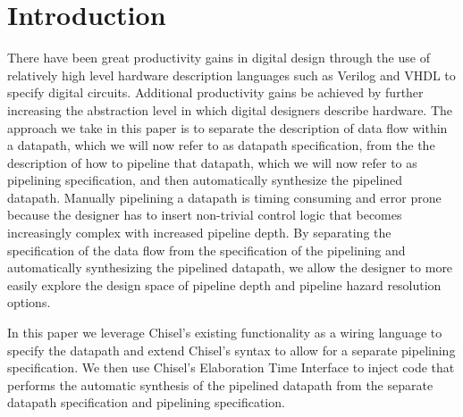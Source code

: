 \section{Introduction}
There have been great productivity gains in digital design through the use of relatively high level hardware description languages such as Verilog and VHDL to specify digital circuits. Additional productivity gains be achieved by further increasing the abstraction level in which digital designers describe hardware. The approach we take in this paper is to separate the description of data flow within a datapath, which we will now refer to as datapath specification, from the the description of how to pipeline that datapath, which we will now refer to as pipelining specification, and then automatically synthesize the pipelined datapath. Manually pipelining a datapath is timing consuming and error prone because the designer has to insert non-trivial control logic that becomes increasingly complex with increased pipeline depth. By separating the specification of the data flow from the specification of the pipelining and automatically synthesizing the pipelined datapath, we allow the designer to more easily explore the design space of pipeline depth and pipeline hazard resolution options. 

In this paper we leverage Chisel's existing functionality as a wiring language to specify the datapath and extend Chisel's syntax to allow for a separate pipelining specification. We then use Chisel's Elaboration Time Interface to inject code that performs the automatic synthesis of the pipelined datapath from the separate datapath specification and pipelining specification.

